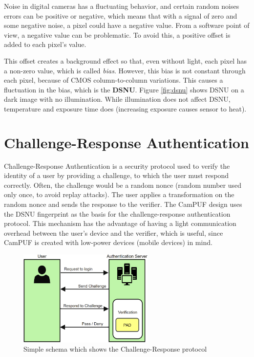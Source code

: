 Noise in digital cameras has a fluctuating behavior, and certain random noises errors can be positive or negative, which means that with a signal of zero and some negative noise, a pixel could have a negative value.
From a software point of view, a negative value can be problematic. To avoid this, a positive offset is added to each pixel's value.

This offset creates a background effect so that, even without light, each pixel has a non-zero value, which is called \textit{bias}.
However, this bias is not constant through each pixel, because of CMOS column-to-column variations. This causes a fluctuation in the bias, which is the \textbf{DSNU}.
Figure \ref{fig:dsnu} shows DSNU on a dark image with no illumination. While illumination does not affect DSNU, temperature and exposure time does (increasing exposure causes sensor to heat).

\section{\textbf{Challenge-Response Authentication}}

Challenge-Response Authentication is a security protocol used to verify the identity of a user by providing a challenge, to which the user must respond correctly.
Often, the challenge would be a random nonce (random number used only once, to avoid replay attacks). The user applies a transformation on the random nonce and sends the response to the verifier.
The CamPUF design uses the DSNU fingerprint as the basis for the challenge-response authentication protocol.
This mechanism has the advantage of having a light communication overhead between the user's device and the verifier, which is useful, since CamPUF is created with low-power devices (mobile devices) in mind.

\begin{figure}[h!]                      %
    \centering
    \includegraphics[width=0.6\textwidth]{images/Challenge_Response_Auth.png}
    \caption{Simple schema which shows the Challenge-Response protocol}
    \label{fig:cr_auth}
\end{figure}

